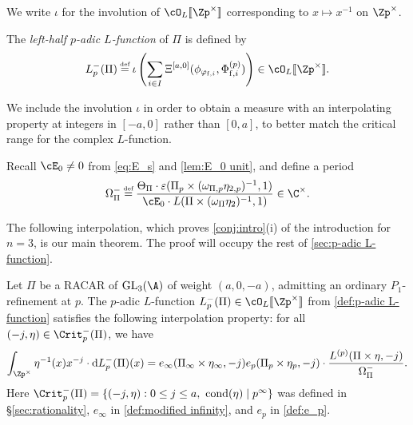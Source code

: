 \documentclass[10pt,reqno,a4paper]{amsart}
\newcommand{\GL}{\mathrm{GL}}
\begin{document}
\begin{definition}
 We write $\iota$ for the involution of $\cO_L[\![\Zp^\times]\!]$ corresponding to $x \mapsto x^{-1}$ on $\Zp^\times$.
\end{definition}

\begin{definition}\label{def:p-adic L-function}
The \emph{left-half $p$-adic $L$-function} of $\Pi$ is defined by
\[ L_p^-(\Pi) \defeq \iota\left( \sum_{i \in I} \Xi^{[a,0]}(\phi_{\varphi_{\mathrm{f}, i}},\Phi^{(p)}_{\mathrm{f}, i})\right) \in \cO_L[\![\Zp^\times]\!].\]
\end{definition}

\begin{remark}
		We include the involution $\iota$ in order to obtain a measure with an interpolating property at integers in $[-a, 0]$ rather than $[0, a]$, to better match the critical range for the complex $L$-function.
		\end{remark}
	
 
Recall $\cE_0 \neq 0$ from \eqref{eq:E_s} and \cref{lem:E_0 unit}, and define a period
\begin{equation}\label{eq:Omega}
\Omega_\Pi^- \defeq \frac{\Theta_\Pi \cdot \varepsilon(\Pi_p \times (\omega_{\Pi,p}\eta_{2,p})^{-1},1)}{ \cE_0 \cdot L(\Pi\times(\omega_{\Pi}\eta_{2})^{-1},1)} \in \C^\times.
\end{equation}


The following interpolation, which proves \cref{conj:intro}(i) of the introduction for $n=3$, is our main theorem. The proof will occupy the rest of \cref{sec:p-adic L-function}.

\begin{theorem}\label{thm:main thm}
	Let $\Pi$ be a RACAR of $\GL_3(\A)$ of weight $(a,0,-a)$, admitting an ordinary $P_1$-refinement at $p$. The $p$-adic $L$-function $L_p^-(\Pi) \in \cO_L[\![\Zp^\times]\!]$ from \cref{def:p-adic L-function} satisfies the following interpolation property: for all $(-j,\eta) \in \Crit^-_p(\Pi)$, we have
\begin{equation}\label{eq:interpolation final}
	\int_{\Zp^\times} \eta^{-1}(x)x^{-j} \cdot \mathrm{d}L_p^-(\Pi)(x) = e_\infty(\Pi_\infty \times \eta_\infty, -j) e_p(\Pi_p \times \eta_p, -j)\cdot \frac{L^{(p)}(\Pi\times\eta,-j)}{\Omega_\Pi^-}.
\end{equation}
Here $\Crit^-_p(\Pi) = \{(-j,\eta) : 0 \leq j \leq a, \ \mathrm{cond}(\eta) \mid p^\infty\}$ was defined in \S\ref{sec:rationality}, $e_\infty$ in \cref{def:modified infinity}, and $e_p$ in \cref{def:e_p}.
\end{theorem}
\end{document}
